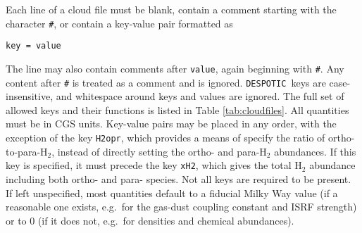 \documentclass[12pt]{article}
\newcommand{\despotic}{\texttt{DESPOTIC}}
\begin{document}
Each line of a cloud file must be blank, contain a comment starting with the character \verb=#=, or contain a key-value pair formatted as
\begin{verbatim}
key = value
\end{verbatim}
The line may also contain comments after \verb=value=, again beginning with \verb=#=. Any content after \verb=#= is treated as a comment and is ignored. \despotic\ keys are case-insensitive, and whitespace around keys and values are ignored. The full set of allowed keys and their functions is listed in Table \ref{tab:cloudfiles}. All quantities must be in CGS units. Key-value pairs may be placed in any order, with the exception of the key \verb=H2opr=, which provides a means of specify the ratio of ortho-to-para-H$_2$, instead of directly setting the ortho- and para-H$_2$ abundances. If this key is specified, it must precede the key \verb=xH2=, which gives the total H$_2$ abundance including both ortho- and para- species. Not all keys are required to be present. If left unspecified, most quantities default to a fiducial Milky Way value (if a reasonable one exists, e.g.~for the gas-dust coupling constant and ISRF strength) or to 0 (if it does not, e.g.~for densities and chemical abundances).
\end{document}
